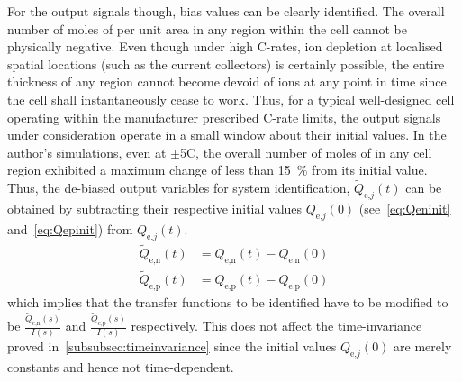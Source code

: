 For  the output  signals  though, bias  values can  be  clearly identified.  The
overall number of moles of  per unit area in any region within the cell
cannot be physically negative. Even though  under high C-rates, ion depletion at
localised  spatial  locations (such  as  the  current collectors)  is  certainly
possible, the entire thickness of any region cannot become devoid of ions at any
point in time  since the cell shall  instantaneously cease to work.  Thus, for a
typical well-designed  cell operating within the  manufacturer prescribed C-rate
limits, the output  signals under consideration operate in a  small window about
their initial values. In the author's  simulations, even at $\pm$5C, the overall
number of moles  of  in any  cell region exhibited a  maximum change of
less than \SI{15}{\percent}  from its initial value. Thus,  the de-biased output
variables  for  system  identification, $\widetilde{Q}_{\text{e,}j}(t)$  can  be
obtained  by subtracting  their  respective  initial values  $Q_{\text{e,}j}(0)$
(see~\cref{eq:Qeninit} and~\cref{eq:Qepinit}) from $Q_{\text{e,}j}(t)$.
\begin{align}
    \widetilde{Q}_\text{e,n}(t) & = {Q}_\text{e,n}(t) - {Q}_\text{e,n}(0) \\
    \widetilde{Q}_\text{e,p}(t) & = {Q}_\text{e,p}(t) - {Q}_\text{e,p}(0)
\end{align}
which   implies   that   the   transfer  functions   to   be   identified   have
to   be   modified    to   be   $\frac{\widetilde{Q}_\text{e,n}(s)}{I(s)}$   and
$\frac{\widetilde{Q}_\text{e,p}(s)}{I(s)}$  respectively. This  does not  affect
the time-invariance proved  in~\cref{subsubsec:timeinvariance} since the initial
values $Q_{\text{e,}j}(0)$ are merely constants and hence not time-dependent.

